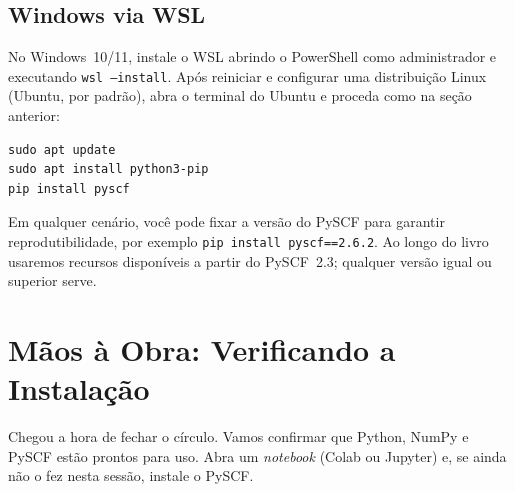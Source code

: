 \documentclass[11pt,a4paper,openany]{book}
\newcommand{\code}[1]{\texttt{#1}}
\newcommand{\pyscf}{\textsf{PySCF}}
\newcommand{\numpy}{\textsf{NumPy}}
\newcommand{\python}{\textsf{Python}}
\begin{document}
\subsection{Windows via WSL}

No Windows~10/11, instale o WSL abrindo o PowerShell como administrador e
executando \code{wsl --install}. Após reiniciar e configurar uma distribuição Linux
(Ubuntu, por padrão), abra o terminal do Ubuntu e proceda como na seção anterior:

\begin{lstlisting}[style=console]
sudo apt update
sudo apt install python3-pip
pip install pyscf
\end{lstlisting}

\begin{caixadica}
Em qualquer cenário, você pode fixar a versão do \pyscf{} para garantir
reprodutibilidade, por exemplo \code{pip install pyscf==2.6.2}. Ao longo do livro
usaremos recursos disponíveis a partir do \pyscf{}~2.3; qualquer versão igual ou
superior serve.
\end{caixadica}

\section{Mãos à Obra: Verificando a Instalação}
\label{sec:maos}

Chegou a hora de fechar o círculo. Vamos confirmar que \python{}, \numpy{} e
\pyscf{} estão prontos para uso. Abra um \emph{notebook} (Colab ou Jupyter) e, se
ainda não o fez nesta sessão, instale o \pyscf{}.
\end{document}
